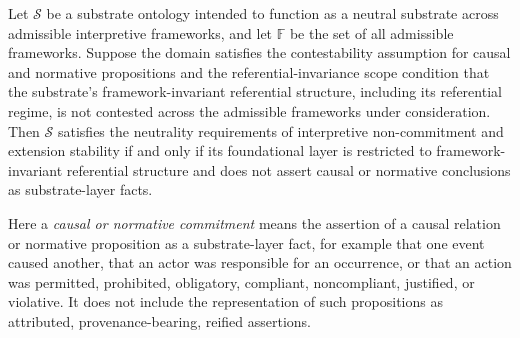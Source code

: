 \begin{theorem}
  \label{thm:neutrality}
  Let $\mathcal{S}$ be a substrate ontology intended to function
  as a neutral substrate across admissible interpretive frameworks,
  and let $\mathbb{F}$ be the set of all admissible frameworks.
  Suppose the domain satisfies the contestability assumption
  for causal and normative propositions
  and the referential-invariance scope condition
  that the substrate's framework-invariant referential structure,
  including its referential regime,
  is not contested
  across the admissible frameworks under consideration.
  Then $\mathcal{S}$ satisfies the neutrality requirements
  of interpretive non-commitment and extension stability
  if and only if its foundational layer
  is restricted to framework-invariant referential structure and
  does not assert causal or normative conclusions as substrate-layer facts.
\end{theorem}

Here a \emph{causal or normative commitment} means the assertion
of a causal relation or normative proposition as a substrate-layer fact,
for example that one event caused another,
that an actor was responsible for an occurrence,
or that an action was permitted, prohibited,
obligatory, compliant, noncompliant, justified, or violative.
It does not include the representation of such propositions
as attributed, provenance-bearing, reified assertions.

